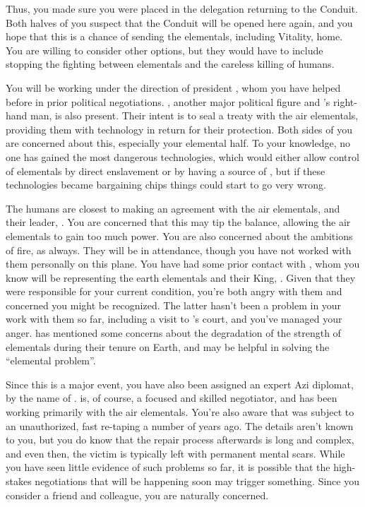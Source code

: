 \documentclass[char]{elementals}
\begin{document}
Thus, you made sure you were placed in the delegation returning to the Conduit.  Both halves of you suspect that the Conduit will be opened here again, and you hope that this is a chance of sending the elementals, including Vitality, home.  You are willing to consider other options, but they would have to include stopping the fighting between elementals and the careless killing of humans.

You will be working under the direction of president \cLeader{\intro}, whom you have helped before in prior political negotiations.  \cDema{\intro}, another major political figure and \cLeader{}'s right-hand man, is also present.  Their intent is to seal a treaty with the air elementals, providing them with technology in return for their protection.  Both sides of you are concerned about this, especially your elemental half.  To your knowledge, no one has gained the most dangerous technologies, which would either allow control of elementals by direct enslavement or by having a source of \iWhiteQ{\MYname{}}, but if these technologies became bargaining chips things could start to go very wrong.

The humans are closest to making an agreement with the air elementals, and their leader, \cKing{}.  You are concerned that this may tip the balance, allowing the air elementals to gain too much power.  You are also concerned about the ambitions of fire, as always.  They will be in attendance, though you have not worked with them personally on this plane.  You have had some prior contact with \cLoyal{}, whom you know will be representing the earth elementals and their King, \cEarthKing{}.  Given that they were responsible for your current condition, you're both angry with them and concerned you might be recognized.  The latter hasn't been a problem in your work with them so far, including a visit to \cEarthKing{}'s court,  and you've managed your anger.  \cLoyal{} has mentioned some concerns about the degradation of the strength of elementals during their tenure on Earth, and may be helpful in solving the ``elemental problem''.

Since this is a major event, you have also been assigned an expert Azi diplomat, by the name of \cDiplomat{}.  \cDiplomat{\They} is, of course, a focused and skilled negotiator, and has been working primarily with the air elementals.  You're also aware that \cDiplomat{\they} was subject to an unauthorized, fast re-taping a number of years ago.  The details aren't known to you, but you do know that the repair process afterwards is long and complex, and even then, the victim is typically left with permanent mental scars.  While you have seen little evidence of such problems so far, it is possible that the high-stakes negotiations that will be happening soon may trigger something.  Since you consider \cDiplomat{} a friend and colleague, you are naturally concerned.
\end{document}

